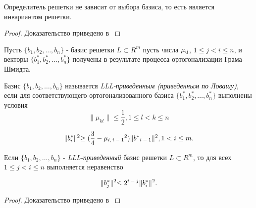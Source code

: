   \begin{theorem}
   Определитель решетки не зависит от выбора базиса, то есть является инвариантом решетки.
   
   \begin{proof}
    Доказательство приведено в \cite[Глава 8.2, страница 261]{mah06}
  \end{proof}
  \end{theorem}  
  
  Пусть {$\{ b_1, b_2, \dots, b_n \}$} - базис решетки {$L \subset R^m$}  пусть числа {$\mu\textsubscript{ij}$}, {$1 \le j < i \le n$}, и векторы
  {$\{b_1^*, b_2^*, \dots, b_n^*\}$} получены в результате процесса ортогонализации Грама-Шмидта.
  
  \begin{definition}
   Базис {$\{b_1, b_2, \dots, b_n\}$} называется \textit{LLL-приведенным (приведенным по Ловашу)}, если для соответствующего ортогонализованного базиса
   {$\{b_1^*, b_2^*, \dots, b_n^*\}$} выполнены условия
    \begin{equation}
      \lVert \mu_{kl} \lVert \le \frac{1}{2}, 1 \le l < k \le n
    \end{equation}
   
   \begin{equation}
      \lVert b_i^* \lVert^2 \ge (\frac{3}{4} - \mu\textsubscript{{$i,i-1$}}^2)\lVert b^*\textsubscript{{$i-1$}} \lVert^2, 1<i \le m.
   \end{equation}

  \end{definition}
  
  \begin{lemma}
   Если {$\{b_1, b_2, \dots, b_n\}$} - \textit{LLL-приведенный} базис решетки {$L \subset R^m$}, то для всех {$1 \le j < i \le n$} выполняется неравенство
   
   \begin{equation}
    \lVert b_j^* \lVert^2 \le 2\textsuperscript{{$i-j$}} \lVert b_i^* \lVert^2.
   \end{equation}
   \begin{proof}
      Доказательство приведено в \cite[Глава 8.2, страница 265]{mah06}
   \end{proof}   
  \end{lemma}
  
